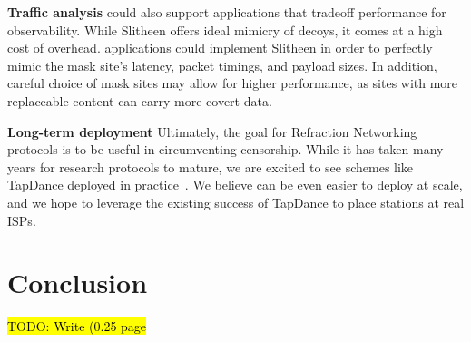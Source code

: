 \documentclass[letterpaper,twocolumn,10pt]{article}
\newcommand{\TODO}[1]{\hl{TODO: #1}\xspace}
\renewcommand{\paragraph}[1]{\smallskip\noindent\textbf{#1\quad}}
\begin{document}
\paragraph{Traffic analysis}
\scheme could also support applications that tradeoff performance for
observability. While Slitheen offers ideal mimicry of decoys, it comes at a high
cost of overhead. \scheme applications could implement Slitheen
in order to perfectly mimic the mask site's latency, packet timings, and payload
sizes. In addition, careful choice of mask sites may allow for higher
performance, as sites with more replaceable content can carry more covert data.

\paragraph{Long-term deployment}
Ultimately, the goal for Refraction Networking protocols is to be useful in
circumventing censorship. While it has taken many years for research
protocols to mature, we are excited to see schemes like TapDance deployed in
practice~\cite{frolov2017isp}. We believe \scheme can be even easier to deploy
at scale, and we hope to leverage the existing success of TapDance to place \scheme
stations at real ISPs.

\section{Conclusion}

\TODO{Write (0.25 page}

%



\small

\end{document}
